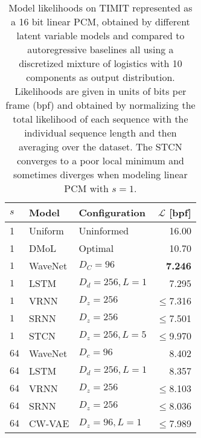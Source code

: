 {\begin{table}[t!]
    \caption{
    Model likelihoods on TIMIT represented as a 16 bit linear PCM, obtained by different latent variable models and compared to autoregressive baselines all using a discretized mixture of logistics with 10 components as output distribution. Likelihoods are given in units of bits per frame (bpf) and obtained by normalizing the total likelihood of each sequence with the individual sequence length and then averaging over the dataset. The STCN converges to a poor local minimum and sometimes diverges when modeling linear PCM with $s=1$.
    }
    \centering
    \begin{tabular}{lll|r}
        \toprule
        $s$    & \bf Model              & \bf Configuration     & \bf $\mathcal{L}$ [bpf] \\
        \midrule
        1         & Uniform             & Uninformed            & 16.00 \\
        1         & DMoL                & Optimal               & 10.70 \\   %
        \midrule
        $1$       & WaveNet             & $D_C=96$              & \textbf{7.246} \\
        $1$       & LSTM                & $D_d=256, L=1$        & 7.295 \\
        $1$       & VRNN                & $D_z=256$             & $\leq$7.316 \\
        $1$       & SRNN                & $D_z=256$             & $\leq$7.501 \\
        $1$       & STCN                & $D_z=256,L=5$         & $\leq$9.970 \\
        \midrule
        $64$      & WaveNet             & $D_c=96$              & 8.402 \\
        $64$      & LSTM                & $D_d=256, L=1$        & 8.357 \\
        $64$      & VRNN                & $D_z=256$             & $\leq$8.103 \\
        $64$      & SRNN                & $D_z=256$             & $\leq$8.036 \\
        $64$      & CW-VAE              & $D_z=96, L=1$         & $\leq$7.989 \\

\end{tabular}
\end{table}}
